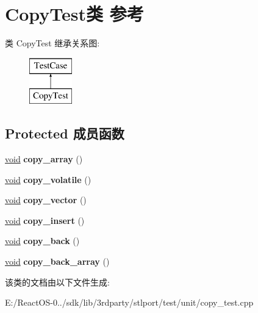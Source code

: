 \hypertarget{class_copy_test}{}\section{Copy\+Test类 参考}
\label{class_copy_test}
类 Copy\+Test 继承关系图\+:\begin{figure}[H]
\begin{center}
\leavevmode
\includegraphics[height=2.000000cm]{class_copy_test}
\end{center}
\end{figure}
\subsection*{Protected 成员函数}
\begin{DoxyCompactItemize}
\item 
\mbox{\label{class_copy_test_a7f50a70ca015ad29067e9653ee14dd6a}} 
\hyperlink{interfacevoid}{void} {\bfseries copy\+\_\+array} ()
\item 
\mbox{\label{class_copy_test_ab8b8736d536c96c9553977d0502f9de0}} 
\hyperlink{interfacevoid}{void} {\bfseries copy\+\_\+volatile} ()
\item 
\mbox{\label{class_copy_test_a5acb9b5db8c54fd83d9c8488105c28f7}} 
\hyperlink{interfacevoid}{void} {\bfseries copy\+\_\+vector} ()
\item 
\mbox{\label{class_copy_test_a6263af6ca3cdbb3420504472503a7f15}} 
\hyperlink{interfacevoid}{void} {\bfseries copy\+\_\+insert} ()
\item 
\mbox{\label{class_copy_test_a7c9ced6be4eef793463c2738bd657058}} 
\hyperlink{interfacevoid}{void} {\bfseries copy\+\_\+back} ()
\item 
\mbox{\label{class_copy_test_ac002d64112150cb264a290c0073932b9}} 
\hyperlink{interfacevoid}{void} {\bfseries copy\+\_\+back\+\_\+array} ()
\end{DoxyCompactItemize}


该类的文档由以下文件生成\+:\begin{DoxyCompactItemize}
\item 
E\+:/\+React\+O\+S-\/0../sdk/lib/3rdparty/stlport/test/unit/copy\+\_\+test.\+cpp\end{DoxyCompactItemize}
